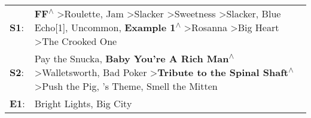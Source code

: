 \begin{supertabular}{p{0.03\textwidth}p{0.92\textwidth}}
 \textbf{S1}:  &  \textbf{FF\textsuperscript{$\wedge$}} \textgreater \enspace Roulette\textsuperscript{}, \enspace Jam\textsuperscript{} \textgreater \enspace Slacker\textsuperscript{} \textgreater \enspace Sweetness\textsuperscript{} \textgreater \enspace Slacker\textsuperscript{}, \enspace Blue Echo[1]\textsuperscript{}, \enspace Uncommon\textsuperscript{}, \enspace \textbf{Example 1\textsuperscript{$\wedge$}} \textgreater \enspace Rosanna\textsuperscript{} \textgreater \enspace Big Heart\textsuperscript{} \textgreater \enspace The Crooked One\textsuperscript{}  \enspace  \\
 \textbf{S2}:  &                                                                                                                                            Pay the Snucka\textsuperscript{}, \enspace \textbf{Baby You're A Rich Man\textsuperscript{$\wedge$}} \textgreater \enspace Walletsworth\textsuperscript{}, \enspace Bad Poker\textsuperscript{} \textgreater \enspace \textbf{Tribute to the Spinal Shaft\textsuperscript{$\wedge$}} \textgreater \enspace Push the Pig\textsuperscript{}, 's Theme\textsuperscript{}, \enspace Smell the Mitten\textsuperscript{}  \enspace  \\
 \textbf{E1}:  &                                                                                                                                                                                                                                                                                                                                                                                                                                                                                                                                Bright Lights, Big City\textsuperscript{}  \enspace  \\
\end{supertabular}
